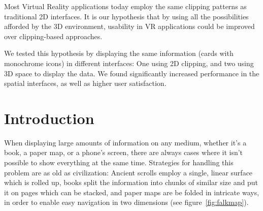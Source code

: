 \documentclass{tufte-book} %
\begin{document}
Most Virtual Reality applications today employ the same clipping patterns as traditional 2D interfaces. It is our hypothesis that by using all the possibilities afforded by the 3D environment, usability in VR applications could be improved over clipping-based approaches.

We tested this hypothesis by displaying the same information (cards with monochrome icons) in different interfaces: One using 2D clipping, and two using 3D space to display the data. We found significantly increased performance in the spatial interfaces, as well as higher user satisfaction.




\chapter{Introduction} %

When displaying large amounts of information on any medium, whether it's a book, a paper map, or a phone's screen, there are always cases where it isn't possible to show everything at the same time. Strategies for handling this problem are as old as civilization: Ancient scrolls employ a single, linear surface which is rolled up, books split the information into chunks of similar size and put it on pages which can be stacked, and paper maps are be folded in intricate ways, in order to enable easy navigation in two dimensions (see figure~\ref{fig:falkmap}).
\end{document}
